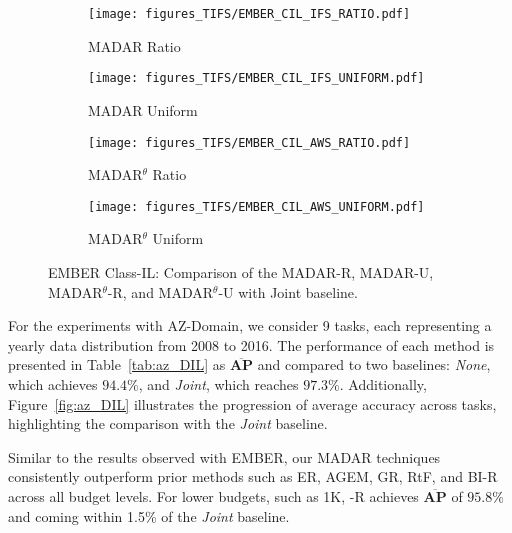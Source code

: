 \begin{figure}[!t]
    \centering
    \begin{subfigure}{0.485\linewidth}
        \centering
        \texttt{[image: figures\_TIFS/EMBER\_CIL\_IFS\_RATIO.pdf]}
        \label{fig:EMBER_CIL_IFS_R}
        \vspace{-0.4cm}
        \caption{MADAR Ratio}
    \end{subfigure}
    \hfill
    \begin{subfigure}{0.485\linewidth}
        \centering
        \texttt{[image: figures\_TIFS/EMBER\_CIL\_IFS\_UNIFORM.pdf]}
        \label{fig:EMBER_CIL_IFS_U}
        \vspace{-0.4cm}
        \caption{MADAR Uniform}
    \end{subfigure}
    \vfill
    \begin{subfigure}{0.485\linewidth}
        \centering
        \texttt{[image: figures\_TIFS/EMBER\_CIL\_AWS\_RATIO.pdf]}
        \label{fig:EMBER_CIL_AWS_R}
        \vspace{-0.4cm}
        \caption{MADAR$^\theta$ Ratio}
    \end{subfigure}
    \hfill
    \begin{subfigure}{0.485\linewidth}
        \centering
        \texttt{[image: figures\_TIFS/EMBER\_CIL\_AWS\_UNIFORM.pdf]}
        \label{fig:EMBER_CIL_AWS_U}
        \vspace{-0.4cm}
        \caption{MADAR$^\theta$ Uniform}
    \end{subfigure}

    \caption{EMBER Class-IL: Comparison of the MADAR-R, MADAR-U, MADAR$^\theta$-R, and MADAR$^\theta$-U with Joint baseline.}
    \label{fig:ember_CIL}
    \vspace{-0.3cm}
\end{figure}


For the experiments with AZ-Domain, we consider 9 tasks, each representing a yearly data distribution from 2008 to 2016. The performance of each method is presented in Table~\ref{tab:az_DIL} as $\mathbf{\overline{AP}}$ and compared to two baselines: \textit{None}, which achieves $94.4\%$, and \textit{Joint}, which reaches $97.3\%$. Additionally, Figure~\ref{fig:az_DIL} illustrates the progression of average accuracy across tasks, highlighting the comparison with the \textit{Joint} baseline.

Similar to the results observed with EMBER, our MADAR techniques consistently outperform prior methods such as ER, AGEM, GR, RtF, and BI-R across all budget levels. For lower budgets, such as 1K, \system-R achieves $\mathbf{\overline{AP}}$ of $95.8\%$ and coming within 1.5\% of the \textit{Joint} baseline.


